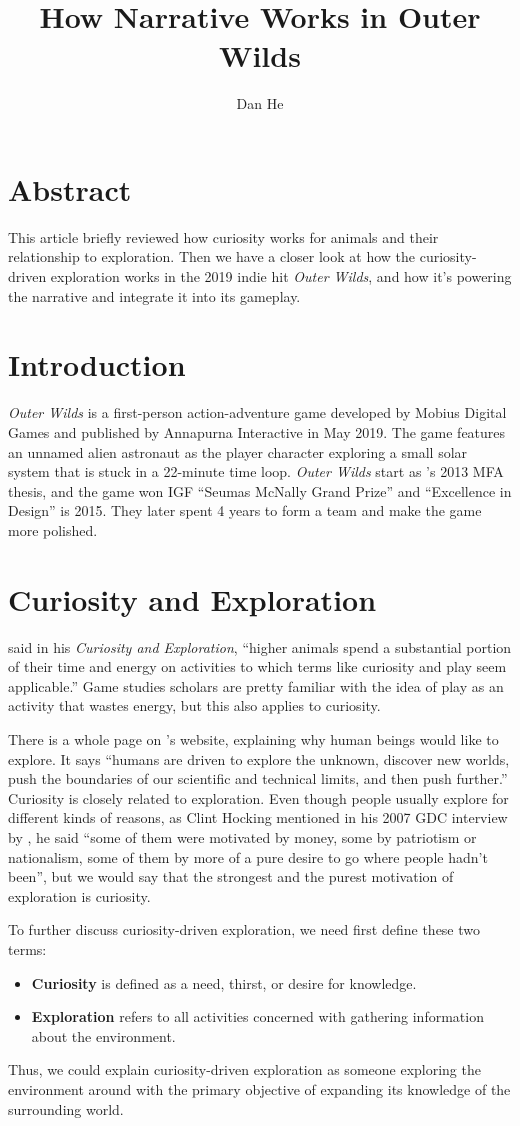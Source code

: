 \documentclass[mla7]{mla}
\title{How Narrative Works in Outer Wilds}
\author{Dan He}
\date{\mladate}
\begin{document}
\section{Abstract}
This article briefly reviewed how curiosity works for animals and their
relationship to exploration. Then we have a closer look at how the
curiosity-driven exploration works in the 2019 indie hit \textit{Outer Wilds},
and how it's powering the narrative and integrate it into its gameplay.

\section{Introduction}
\textit{Outer Wilds} is a first-person action-adventure game developed by Mobius
Digital Games and published by Annapurna Interactive in May 2019. The game
features an unnamed alien astronaut as the player character exploring a small
solar system that is stuck in a 22-minute time loop. \textit{Outer Wilds} start
as \cite{beachum2013outer}'s 2013 MFA thesis, and the game won IGF ``Seumas
McNally Grand Prize'' and ``Excellence in Design'' is 2015. They later spent 4
years to form a team and make the game more polished.

\section{Curiosity and Exploration}
\cite{berlyne1966curiosity} said in his \textit{Curiosity and Exploration},
``higher animals spend a substantial portion of their time and energy on
activities to which terms like curiosity and play seem applicable.'' Game
studies scholars are pretty familiar with the idea of play as an activity that
wastes energy, but this also applies to curiosity.

There is a whole page on \cite{nasa}'s website, explaining why human beings
would like to explore. It says ``humans are driven to explore the unknown,
discover new worlds, push the boundaries of our scientific and technical limits,
and then push further.'' Curiosity is closely related to exploration. Even
though people usually explore for different kinds of reasons, as Clint Hocking
mentioned in his 2007 GDC interview by \cite{ruberg2007clint}, he said ``some of
them were motivated by money, some by patriotism or nationalism, some of them by
more of a pure desire to go where people hadn't been'', but we would say that
the strongest and the purest motivation of exploration is curiosity.

To further discuss curiosity-driven exploration, we need first define these two
terms:
\begin{itemize}
\item \textbf{Curiosity} is defined as a need, thirst, or desire for knowledge.
\item \textbf{Exploration} refers to all activities concerned with gathering
  information about the environment.
\end{itemize}
Thus, we could explain curiosity-driven exploration as someone exploring the
environment around with the primary objective of expanding its knowledge of the
surrounding world.
\end{document}
